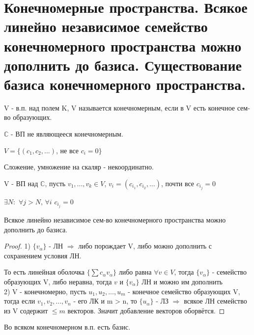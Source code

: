 \documentclass[12pt, fleqn]{article}
\begin{document}
\section{Конечномерные пространства. Всякое линейно независимое семейство конечномерного пространства можно дополнить
    до базиса. Существование базиса конечномерного пространства.}

    \begin{definition}
        V - в.п. над полем K, V называется конечномерным, если в V есть конечное сем-во образующих.
    \end{definition}

    \begin{example}
        $\mathds{C}$ - ВП не являющееся конечномерным.

        $V=\{(c_1,c_2,...)$, не все $c_i=0\}$

        Сложение, умножение на скаляр - некоординатно.

        V - ВП над $\mathds{C}$, пусть $v_1,...,v_k \in V$, $v_i=(c_{i_1}, c_{i_2},...)$, почти все $c_{i_j}=0$

        $\exists N:$ $\forall j > N$, $\forall i$ $c_{i_j}=0$
    \end{example}

    \begin{theorem}
        Всякое линейно независимое сем-во конечномерного пространства можно дополнить до базиса.
    \end{theorem}

    \begin{proof}
        1) $\{v_\alpha\}$ - ЛН $\Rightarrow$ либо порождает V, либо можно дополнить с сохранением условия ЛН.

        То есть линейная оболочка $\{\sum c_\alpha v_\alpha\}$ либо равна $\forall v \in V$, тогда $\{v_\alpha\}$ - семейство образующих V, либо неравна, тогда $v$ и $\{v_\alpha\}$ ЛН и можно им дополнить
        \\
        2) V - конечномерно, пусть $u_1,u_2,...,u_m$ - конечное семейство образующих V, тогда если $v_1,v_2,...,v_n$ - его ЛК и m > n, то $\{u_\alpha\}$ - ЛЗ $\Rightarrow$ всякое ЛН семейство из V содержит $\leqslant m$ векторов. Значит добавление векторов оборвётся.
    \end{proof}


    \begin{consequence}
        Во всяком конечномерном в.п. есть базис.
    \end{consequence}
\end{document}
